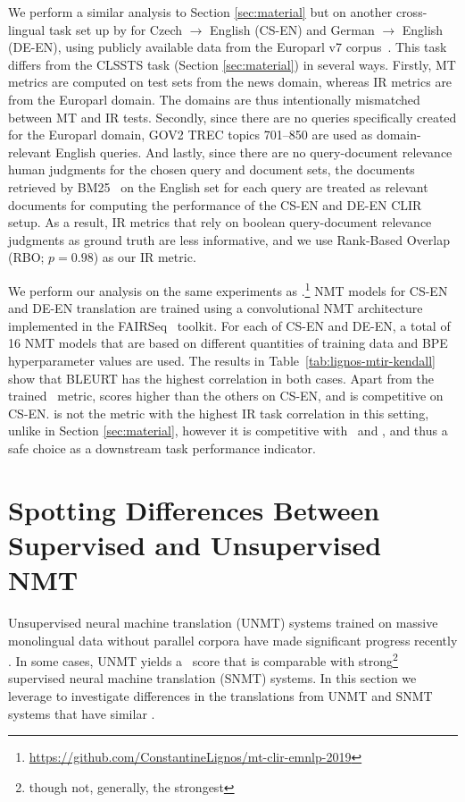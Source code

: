 We perform a similar analysis to Section \ref{sec:material} but on another cross-lingual task set up by \citet{lignos-etal-2019-MT-IR} for Czech $\rightarrow$ English (CS-EN) and German $\rightarrow$ English (DE-EN), using publicly available data from the Europarl v7 corpus~\cite{koehn2005europarl}. 
This task differs from the CLSSTS task (Section \ref{sec:material}) in several ways.
Firstly, MT metrics are computed on test sets from the news domain, whereas IR metrics are from the Europarl domain. The domains are thus intentionally mismatched between MT and IR tests.
Secondly, since there are no queries specifically created for the Europarl domain, GOV2 TREC topics 701–850 are used as domain-relevant English queries.
And lastly, since there are no query-document relevance human judgments for the chosen query and document sets, the documents retrieved by BM25~\cite{jones2000probabilistic} on the English set for each query are treated as relevant documents for computing the performance of the CS-EN and DE-EN CLIR setup. 
As a result, IR metrics that rely on boolean query-document relevance judgments as ground truth are less informative, and we use Rank-Based Overlap (RBO; $p=0.98$) \cite{webber2010RBO} as our IR metric.

We perform our analysis on the same experiments as \citet{lignos-etal-2019-MT-IR}.\footnote{\url{https://github.com/ConstantineLignos/mt-clir-emnlp-2019}}
NMT models for CS-EN and DE-EN translation are trained using a convolutional NMT architecture \cite{gehring2017CNNMT} implemented in the FAIRSeq~\cite{ott-etal-2019-fairseq} toolkit.
For each of CS-EN and DE-EN, a total of 16 NMT models that are based on different quantities of training data and BPE hyperparameter values are used.
The results in Table~\ref{tab:lignos-mtir-kendall} show that BLEURT has the highest correlation in both cases.
Apart from the trained \blrtmd\ metric,  scores higher than the others on CS-EN, and is competitive on CS-EN.  is not the metric with the highest IR task correlation in this setting, unlike in Section \ref{sec:material}, however it is competitive with \bleu\ and , and thus a safe choice as a downstream task performance indicator. 


\section{Spotting Differences Between Supervised and Unsupervised NMT}
\label{sec:unmt}

Unsupervised neural machine translation (UNMT) systems trained on massive monolingual data without parallel corpora have made significant progress recently \cite{Artetxe-2018-unmt-iclr,Lample-2018-unmt-iclr,lample-etal-2018-phrase-unmt,conneau-NIPS2019-xlm,Song-2019-MASS,liu-etal-2020-multilingual-denoising}. 
In some cases, UNMT yields a \bleu\ score that is comparable with strong\footnote{though not, generally, the strongest} supervised neural machine translation (SNMT) systems. In this section we leverage  to investigate differences in the translations from UNMT and SNMT systems that have similar \bleu.


